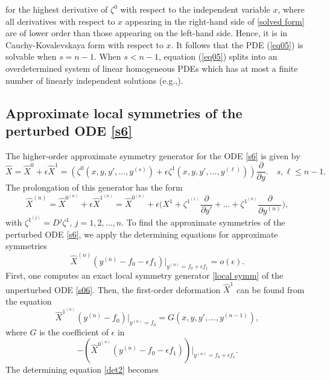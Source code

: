 \documentclass[11pt,letter,subeqn]{article}
\begin{document}
   for the highest derivative of $\zeta^0$ with respect to the independent variable $x$, where all derivatives with respect to $x$ appearing in the right-hand side of \eqref{solved form} are of lower order than those appearing on the left-hand side. Hence, it is in \textrm{{Cauchy-Kovalevskaya form}} with respect to $x$. It follows that the PDE (\ref{eq05}) is solvable when $s=n-1$. When $s< n-1$, equation (\ref{eq05}) splits into an overdetermined system of linear homogeneous PDEs which has at most a finite number of linearly independent solutions (e.g.,\cite{bluman2008symmetry}).
   \subsection{Approximate local symmetries of the perturbed ODE \eqref{s6}}
   The higher-order approximate symmetry generator for the ODE \eqref{s6} is given by
   \begin{equation}\label{local_approx}
      \hat{X} =\hat{ X}^0+\epsilon \hat{X}^1=\left(\zeta^0(x,y,y',...,y^{(s)})+\epsilon \zeta^1(x,y,y',...,y^{(\ell)})\right)\dfrac{\partial}{\partial y}.\quad s,\ell \leq n-1.
   \end{equation}
   The prolongation of this generator has the form
   \begin{equation}\label{}
     \hat{X}^{(n)} = \hat{X}^{0^{(n)}}+\epsilon \hat{X}^{1^{(n)}}= \hat{X}^{0^{(n)}}+\epsilon \big(X^1+\zeta^{1^{(1)}}\dfrac{\partial}{\partial y'}+...+\zeta^{1^{(n)}} \dfrac{\partial}{\partial y^{(n)}}\big),
   \end{equation}
   with  $\zeta^{1^{(j)}}=D^j\zeta^1,\, j=1,2,...,n.$ To find the approximate symmetries of the perturbed ODE \eqref{s6}, we apply the determining equations for approximate symmetries
   \begin{equation}\label{det2}
      \hat{X}^{(n)}(y^{(n)}-f_0- \epsilon f_1)\bigg|_{y^{(n)}=f_0 + \epsilon f_1}=o(\epsilon).
   \end{equation}
   First, one computes an exact local symmetry generator \eqref{local symm} of the unperturbed ODE \eqref{s06}. Then, the first-order deformation $\hat{X}^1$ can be found from the equation
   \[
     \hat{X}^{1^{(n)}}(y^{(n)}-f_0)\bigg|_{y^{(n)}=f_0}=G(x,y,y',...,y^{(n-1)}),
\]
   where $G$ is the coefficient of $\epsilon$ in
   \begin{equation}\label{eq009}
     -\left(\hat{X}^{0^{(n)}}(y^{(n)}-f_0- \epsilon f_1)\right)\bigg|_{y^{(n)}=f_0+\epsilon f_1}.
   \end{equation}
 The determining equation \eqref{det2} becomes
\end{document}
